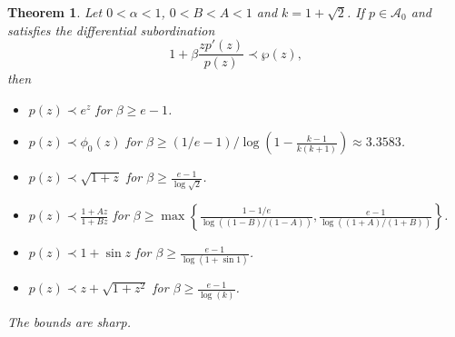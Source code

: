 \documentclass[12pt, reqno]{amsart}
\numberwithin{equation}{section}
\theoremstyle{plain}
\newtheorem{theorem}{Theorem}[section]
\theoremstyle{definition}
\theoremstyle{remark}
\begin{document}
\begin{theorem}
	Let $0<\alpha<1$, $0<B<A<1$ and $k=1+\sqrt{2}$. If $p\in \mathcal{A}_{0}$ and satisfies the differential subordination
	\begin{equation*}
	1+\beta \frac{zp'(z)}{p(z)} \prec \wp(z),  
	\end{equation*}  
	then
	\begin{itemize}
		\item [$(i)$] $p(z)\prec e^z$   for $\beta\geq e-1$.
		\item [$(ii)$] $p(z) \prec \phi_0(z)$   for $\beta\geq (1/e-1)/\log\left({1-\frac{k-1}{k(k+1)}}\right)\approx 3.3583 $.
		\item [$(iii)$] $p(z)\prec \sqrt{1+z}$   for $\beta\geq\frac{e-1}{\log{\sqrt{2}}}$.
		\item [$(iv)$] $p(z)\prec \frac{1+Az}{1+Bz}$   for $\beta\geq \max\left\{\frac{1-1/e}{\log((1-B)/(1-A))}, \frac{e-1}{\log((1+A)/(1+B))}\right\}$.
		\item [$(v)$] $p(z)\prec 1+\sin{z}$   for $\beta\geq \frac{e-1}{\log({1+\sin{1}})}$.
		\item [$(vi)$] $p(z)\prec z+\sqrt{1+z^2}$   for $\beta\geq \frac{e-1}{\log(k)}$.
		
	\end{itemize}
	The bounds are sharp.
\end{theorem}
\end{document}
